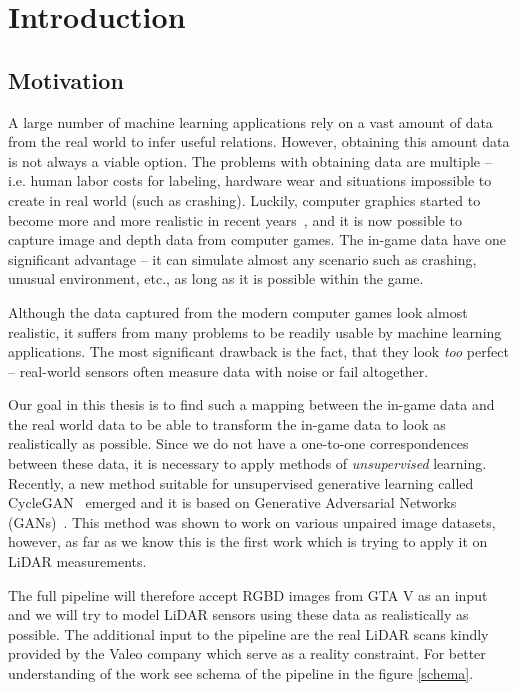 \chapter{Introduction}

\section{Motivation}

A large number of machine learning applications rely on a vast amount of data from the real world to infer useful relations. However, obtaining this amount data is not always a viable option. The problems with obtaining data are multiple -- i.e. human labor costs for labeling, hardware wear and situations impossible to create in real world (such as crashing). Luckily, computer graphics started to become more and more realistic in recent years~\cite{matrix}, and it is now possible to capture image and depth data from computer games. The in-game data have one significant advantage -- it can simulate almost any scenario such as crashing, unusual environment, etc., as long as it is possible within the game.

Although the data captured from the modern computer games look almost realistic, it suffers from many problems to be readily usable by machine learning applications. The most significant drawback is the fact, that they look {\em too} perfect -- real-world sensors often measure data with noise or fail altogether.

Our goal in this thesis is to find such a mapping between the in-game data and the real world data to be able to transform the in-game data to look as realistically as possible. Since we do not have a one-to-one correspondences between these data, it is necessary to apply methods of {\em unsupervised} learning. Recently, a new method suitable for unsupervised generative learning called CycleGAN~\cite{cyclegan} emerged and it is based on Generative Adversarial Networks (GANs)~\cite{origgan}. This method was shown to work on various unpaired image datasets, however, as far as we know this is the first work which is trying to apply it on LiDAR measurements.

The full pipeline will therefore accept RGBD images from GTA V as an input and we will try to model LiDAR sensors using these data as realistically as possible. The additional input to the pipeline are the real LiDAR scans kindly provided by the Valeo company which serve as a reality constraint. For better understanding of the work see schema of the pipeline in the figure \ref{schema}.

